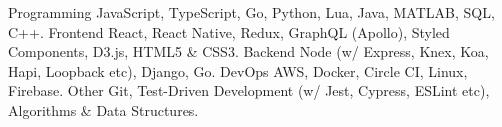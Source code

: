 \vspace{-2mm}
\vspace{-5mm}

\begin{cvskills}
  \cvskill
    {Programming}
    {JavaScript, TypeScript, Go, Python, Lua, Java, MATLAB, SQL, C++.}
  \cvskill
    {Frontend}
    {React, React Native, Redux, GraphQL (Apollo), Styled Components, D3.js, HTML5 \& CSS3.}
  \cvskill
    {Backend}
    {Node (w/ Express, Knex, Koa, Hapi, Loopback etc), Django, Go.}
  \cvskill
    {DevOps}
    {AWS, Docker, Circle CI, Linux, Firebase.}
  \cvskill
    {Other}
    {Git, Test-Driven Development (w/ Jest, Cypress, ESLint etc), Algorithms \& Data Structures.}
\end{cvskills}
